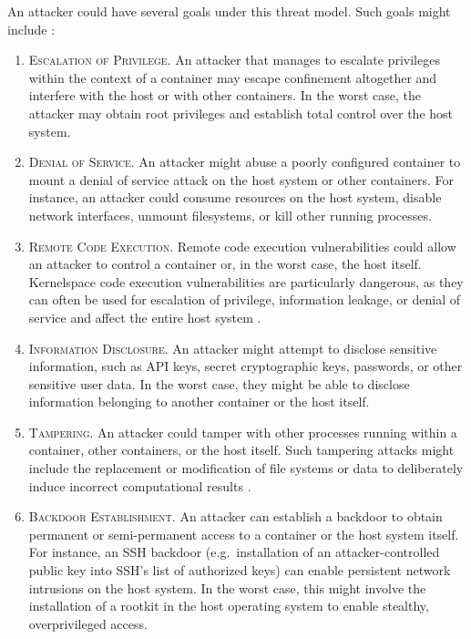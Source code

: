 An attacker could have several goals under this threat model. Such goals might include \cite{sultan2019_container_security,xin2018_container_security}:
\begin{enumerate}[label=\bfseries AG\arabic*., ref=AG\arabic*, labelindent=1em]
  \item \textsc{Escalation of Privilege.}
    An attacker that manages to escalate privileges within the context of a container may escape confinement altogether and interfere with the host or with other containers. In the worst case, the attacker may obtain root privileges and establish total control over the host system.

  \item \textsc{Denial of Service.}
    An attacker might abuse a poorly configured container to mount a denial of service attack on the host system or other containers. For instance, an attacker could consume resources on the host system, disable network interfaces, unmount filesystems, or kill other running processes.

  \item \textsc{Remote Code Execution.}
    Remote code execution vulnerabilities could allow an attacker to control a container or, in the worst case, the host itself. Kernelspace code execution vulnerabilities are particularly dangerous, as they can often be used for escalation of privilege, information leakage, or denial of service and affect the entire host system \cite{sultan2019_container_security, xin2018_container_security}.

  \item \textsc{Information Disclosure.}
    An attacker might attempt to disclose sensitive information, such as API keys, secret cryptographic keys, passwords, or other sensitive user data. In the worst case, they might be able to disclose information belonging to another container or the host itself.

  \item \textsc{Tampering.}
    An attacker could tamper with other processes running within a container, other containers, or the host itself. Such tampering attacks might include the replacement or modification of file systems or data to deliberately induce incorrect computational results \cite{sultan2019_container_security}.

  \item \textsc{Backdoor Establishment.}
    An attacker can establish a backdoor to obtain permanent or semi-permanent access to a container or the host system itself. For instance, an SSH backdoor (e.g.~installation of an attacker-controlled public key into SSH's list of authorized keys) can enable persistent network intrusions on the host system. In the worst case, this might involve the installation of a rootkit \cite{beegle2007_rootkit} in the host operating system to enable stealthy, overprivileged access.
\end{enumerate}

